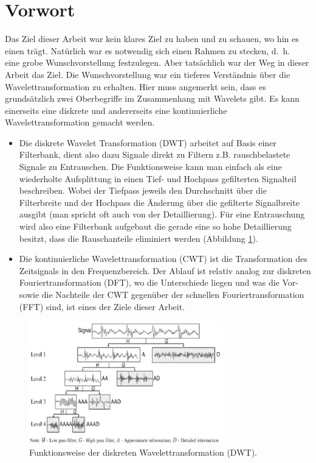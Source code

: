 %
%
%
%
\section{Vorwort\label{wavelets:section:teil0}}
Das Ziel dieser Arbeit war kein klares Ziel zu haben und zu schauen, wo hin es einen trägt. Natürlich war es notwendig sich einen Rahmen zu stecken, d.~h.~ eine grobe Wunschvorstellung festzulegen. Aber tatsächlich war der Weg in dieser Arbeit das Ziel.
Die Wunschvorstellung war ein tieferes Verständnis über die Wavelettransformation zu erhalten. Hier muss angemerkt sein, dass es grundsätzlich zwei Oberbegriffe im Zusammenhang mit Wavelets gibt.
Es kann einerseits eine diskrete und andererseits eine kontinuierliche Wavelettransformation gemacht werden.

\begin{itemize}
	\item   Die diskrete Wavelet Transformation (DWT) arbeitet auf Basis einer Filterbank, dient also dazu Signale direkt zu Filtern z.B. rauschbelastete Signale zu Entrauschen.
	Die Funktionsweise kann man einfach als eine wiederholte Aufsplittung in einen Tief- und Hochpass gefilterten Signalteil beschreiben. Wobei der Tiefpass jeweils den Durchschnitt über die Filterbreite und der Hochpass die Änderung über die gefilterte Signalbreite ausgibt (man spricht oft auch von der Detaillierung). Für eine Entrauschung wird also eine Filterbank aufgebaut die gerade eine so hohe Detaillierung besitzt, dass die Rauschanteile eliminiert werden (Abbildung \ref{wavelet:fig:1_Four-Level-Wavelet-Decomposition}).

 	\item Die kontinuierliche Wavelettransformation (CWT) ist die Transformation des Zeitsignals in den Frequenzbereich. Der Ablauf ist relativ analog zur diskreten Fouriertransformation (DFT), wo die Unterschiede liegen und was die Vor- sowie die Nachteile der CWT gegenüber der schnellen Fouriertransformation (FFT) sind, ist eines der Ziele dieser Arbeit. 
\end{itemize}

\begin{figure}
	\centering
	\includegraphics[width=0.75\textwidth]{papers/wavelets/images/1_Four-Level-Wavelet-Decomposition.png}
	\caption{\cite{Haider.2015} Funktionsweise der diskreten Wavelettransformation (DWT).}
	\label{wavelet:fig:1_Four-Level-Wavelet-Decomposition}
\end{figure}

